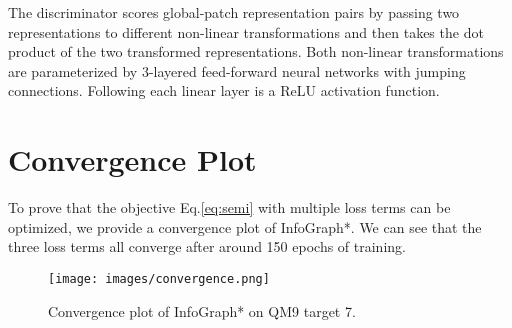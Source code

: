 \documentclass{article} \usepackage{iclr2020_conference,times}
\begin{document}
The discriminator scores global-patch representation pairs by passing two representations to different non-linear transformations and then takes the dot product of the two transformed representations. Both non-linear transformations are parameterized by 3-layered feed-forward neural networks with jumping connections. Following each linear layer is a ReLU activation function. 

\newpage
\section{Convergence Plot}
To prove that the objective Eq.\ref{eq:semi} with multiple loss terms can be optimized, we provide a convergence plot of InfoGraph*. We can see that the three loss terms all converge after around 150 epochs of training.
\begin{figure}[h]
    \centering
    \texttt{[image: images/convergence.png]}
    \caption{Convergence plot of InfoGraph* on QM9 target 7.}
    \label{fig:semi-gnn-infomax}
\end{figure} 
\end{document}

